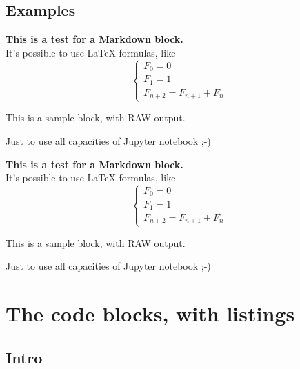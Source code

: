 \documentclass[english,11pt,a4paper]{article}
\begin{document}
\subsection{Examples}

\begin{codehigh}[language=latex/latex2,style/main=cyan!10,style/code=cyan!10]
\begin{NotebookMarkdown}{\linewidth}
{\Large\bfseries This is a test for a \textsf{Markdown} block.}\\
It's possible to use \LaTeX{} formulas, like %
\[
  \left\lbrace\begin{array}{l}
    F_0 = 0\\
    F_1 = 1 \\
    F_{n+2} = F_{n+1} + F_n
  \end{array}\right.
\]
\end{NotebookMarkdown}

\begin{NotebookRaw}{\linewidth}
This is a sample block, with RAW output.

Just to use all capacities of Jupyter notebook ;-)
\end{NotebookRaw}
\end{codehigh}

\begin{NotebookMarkdown}{\linewidth}
{\Large\bfseries This is a test for a \textsf{Markdown} block.}\\
It's possible to use \LaTeX{} formulas, like %
\[
	\left\lbrace\begin{array}{l}
		F_0 = 0\\
		F_1 = 1 \\
		F_{n+2} = F_{n+1} + F_n
	\end{array}\right.
\]
\end{NotebookMarkdown}

\begin{NotebookRaw}{\linewidth}
This is a sample block, with RAW output.

Just to use all capacities of Jupyter notebook ;-)
\end{NotebookRaw}

\pagebreak

\section{The code blocks, with listings}

\subsection{Intro}
\end{document}
